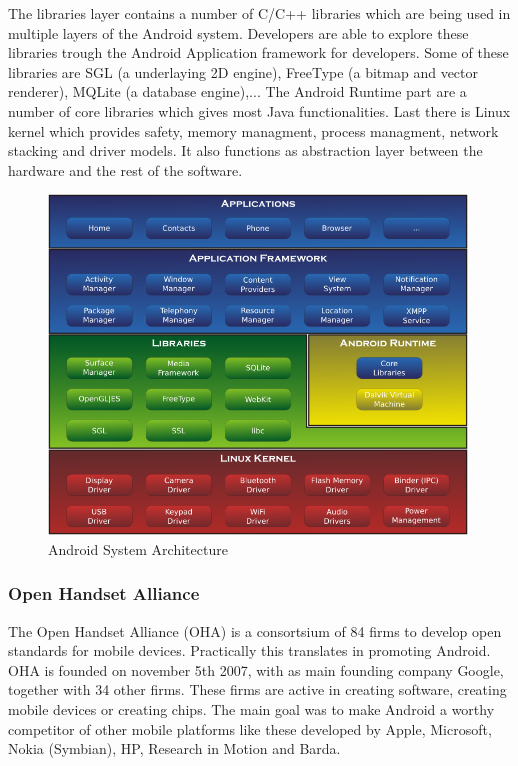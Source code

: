 \documentclass[a4paper,12pt]{report}
\begin{document}
The libraries layer contains a number of C/C++ libraries which are being used in multiple layers of the Android system. Developers are able to explore these libraries
trough the Android Application framework for developers. Some of these libraries are SGL (a underlaying 2D engine), FreeType (a bitmap and vector renderer), MQLite (a 
database engine),... The Android Runtime part are a number of core libraries which gives most Java functionalities. Last there is Linux kernel which provides safety, memory
managment, process managment, network stacking and driver models. It also functions as abstraction layer between the hardware and the rest of the software.
\begin{figure}
  \centering
    \includegraphics[width=0.99\textwidth]{images/Android-System-Architecture.png}
  \caption{Android System Architecture}
\end{figure}
\subsubsection{Open Handset Alliance}
The Open Handset Alliance (OHA) is a consortsium of 84 firms to develop open standards for mobile devices. Practically this translates in promoting Android. OHA is founded
on november 5th 2007, with as main founding company Google, together with 34 other firms. These firms are active in creating software, creating mobile devices or creating
chips. The main goal was to make Android a worthy competitor of other mobile platforms like these developed by Apple, Microsoft, Nokia (Symbian), HP, Research in Motion 
and Barda.
\end{document}
